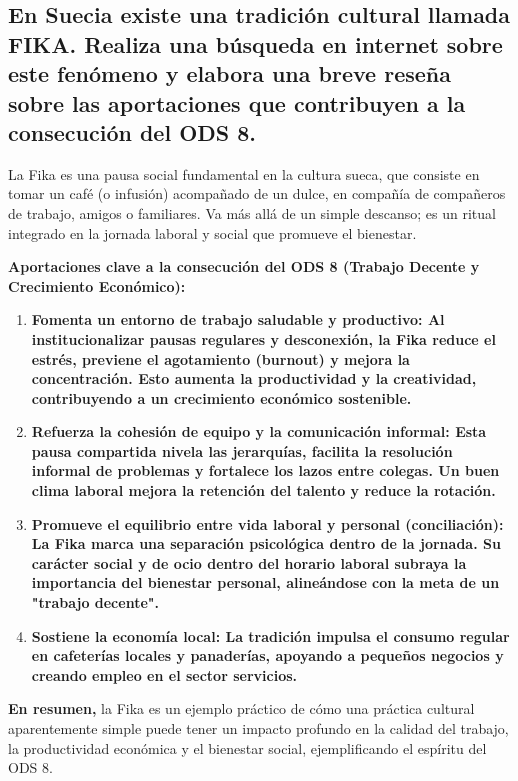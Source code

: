 
\fsection{\boldit{\textcolor{waveBlue2}{Investiga.}}} 
\subsection*{En Suecia existe una tradición cultural llamada FIKA. Realiza una búsqueda en internet sobre este fenómeno y elabora una breve reseña sobre las aportaciones que contribuyen a la consecución del ODS 8.}

\begin{solution}
La Fika es una pausa social fundamental en la cultura sueca, que consiste en tomar un café (o infusión) 
acompañado de un dulce, en compañía de compañeros de trabajo, amigos o familiares. Va más allá de un simple 
descanso; es un ritual integrado en la jornada laboral y social que promueve el bienestar.

\textbf{Aportaciones clave a la consecución del ODS 8 (Trabajo Decente y Crecimiento Económico):}
\begin{enumerate}
	\item \textbf{Fomenta un entorno de trabajo saludable y productivo: Al institucionalizar pausas regulares y desconexión, la Fika reduce el estrés, previene el agotamiento (burnout) y mejora la concentración. Esto aumenta la productividad y la creatividad, contribuyendo a un crecimiento económico sostenible.}
	\item \textbf{Refuerza la cohesión de equipo y la comunicación informal: Esta pausa compartida nivela las jerarquías, facilita la resolución informal de problemas y fortalece los lazos entre colegas. Un buen clima laboral mejora la retención del talento y reduce la rotación.}
	\item \textbf{Promueve el equilibrio entre vida laboral y personal (conciliación): La Fika marca una separación psicológica dentro de la jornada. Su carácter social y de ocio dentro del horario laboral subraya la importancia del bienestar personal, alineándose con la meta de un "trabajo decente".}
	\item \textbf{Sostiene la economía local: La tradición impulsa el consumo regular en cafeterías locales y panaderías, apoyando a pequeños negocios y creando empleo en el sector servicios.}
\end{enumerate}
\textbf{En resumen,} la Fika es un ejemplo práctico de cómo una práctica cultural aparentemente simple puede tener un impacto profundo en la calidad del trabajo, 
la productividad económica y el bienestar social, ejemplificando el espíritu del ODS 8.

\end{solution}

